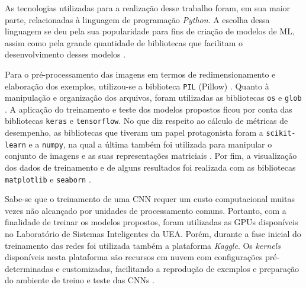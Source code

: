
As tecnologias utilizadas para a realização desse trabalho foram, em sua maior parte, relacionadas à linguagem de programação \emph{Python}. A escolha dessa linguagem se deu pela sua popularidade para fins de criação de modelos de ML, assim como pela grande quantidade de bibliotecas que facilitam o desenvolvimento desses modelos \cite{brink}.

Para o pré-processamento das imagens em termos de redimensionamento e elaboração dos exemplos, utilizou-se a biblioteca \texttt{PIL} (Pillow) \cite{pillow}. Quanto à manipulação e organização dos arquivos, foram utilizadas as bibliotecas \texttt{os} e \texttt{glob} \cite{os,glob}. A aplicação do treinamento e teste dos modelos propostos ficou por conta das bibliotecas \texttt{keras} e \texttt{tensorflow}\cite{keras, tensorflow}. No que diz respeito ao cálculo de métricas de desempenho, as bibliotecas que tiveram um papel protagonista foram a \texttt{scikit-learn} e a \texttt{numpy}, na qual a última também foi utilizada para manipular o conjunto de imagens e as suas representações matriciais \cite{sklearn,numpy}. Por fim, a visualização dos dados de treinamento e de alguns resultados foi realizada com as bibliotecas \texttt{matplotlib} e \texttt{seaborn} \cite{matplotlib, seaborn}.

Sabe-se que o treinamento de uma CNN requer um custo computacional muitas vezes não alcançado por unidades de processamento comuns. Portanto, com a finalidade de treinar os modelos propostos, foram utilizadas as GPUs disponíveis no Laboratório de Sistemas Inteligentes da UEA. Porém, durante a fase inicial do treinamento das redes foi utilizada também a plataforma \emph{Kaggle}. Os \emph{kernels} disponíveis nesta plataforma são recursos em nuvem com configurações pré-determinadas e customizadas, facilitando a reprodução de exemplos e preparação do ambiente de treino e teste das CNNs \cite{kaggle}.
